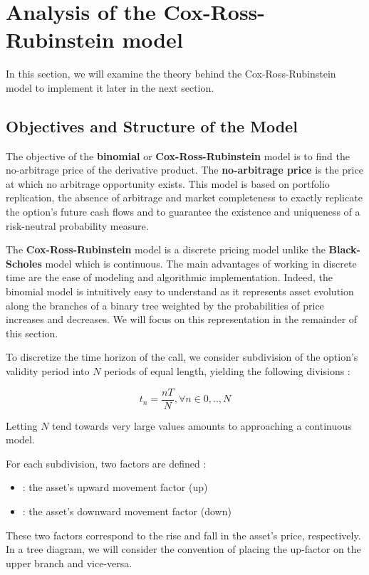 \section{Analysis of the Cox-Ross-Rubinstein model}
In this section, we will examine the theory behind the Cox-Ross-Rubinstein model to implement it later in the next section.

\subsection{Objectives and Structure of the Model}

The objective of the \textbf{binomial} or \textbf{Cox-Ross-Rubinstein} model is to find the no-arbitrage price of the derivative product.
The \textbf{no-arbitrage price} is the price at which no arbitrage opportunity exists.
This model is based on portfolio replication, the absence of arbitrage and market completeness to exactly replicate the option's future cash flows and to guarantee the existence and uniqueness of a risk-neutral probability measure.


The \textbf{Cox-Ross-Rubinstein} model is a discrete pricing model unlike the \textbf{Black-Scholes} model which is continuous.
The main advantages of working in discrete time are the ease of modeling and algorithmic implementation.
Indeed, the binomial model is intuitively easy to understand as it represents asset evolution along the branches of a binary tree weighted by the probabilities of price increases and decreases.
We will focus on this representation in the remainder of this section.

To discretize the time horizon of the call, we consider subdivision of the option's validity period into $N$ periods of equal length, yielding the following divisions :

$$t_n=\frac{nT}{N} ,\forall n \in {0,..,N}$$

\remark Letting $N$ tend towards very large values amounts to approaching a continuous model.

\bigskip

For each subdivision, two factors are defined :
\begin{center}
    \begin{itemize}
        \item[\textbf{u}] : the asset's upward movement factor (up)
        \item[\textbf{d}] : the asset's downward movement factor (down)
    \end{itemize}
\end{center}
These two factors correspond to the rise and fall in the asset's price, respectively.
In a tree diagram, we will consider the convention of placing the up-factor on the upper branch and vice-versa.

